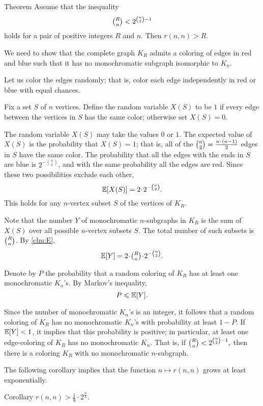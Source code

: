 \medskip

\begin{thm}{Theorem}\label{thm:ramsey-lower}
Assume that the inequality 
\[\tbinom R n < 2^{{\binom n 2} - 1}\]
holds for a pair of positive integers $R$ and $n$.
Then $r(n,n)>R$.
\end{thm}

We need to show that the complete graph $K_R$
admits a coloring of edges in red and blue such that it has no monochromatic subgraph isomorphic to $K_n$.

Let us color the edges randomly;
that is, color each edge independently in red or blue with equal chances.

Fix a set $S$ of $n$ vertices. 
Define the random variable $X(S)$ to be $1$ if every edge between the vertices in $S$ has the same color; otherwise set $X(S)=0$.

The random variable $X(S)$ may take the values $0$ or $1$.
The expected value of $X(S)$ is the probability that $X(S)=1$;
that is, all of the $\tbinom n 2=\tfrac{n\cdot(n-1)}{2}$
edges in $S$ have the same color. 
The probability that all the edges with the ends in $S$ are blue is ${2^{-\binom n 2}}$, and with the same probability all the edges are red.
Since these two possibilities exclude each other, 
\[\EE[X(S)]={2}\cdot {2^{-\binom n 2}}.\]
This holds for any $n$-vertex subset $S$ of the vertices of $K_R$.

Note that the number $Y$ of monochromatic $n$-subgraphs in $K_R$ is the sum of $X(S)$ over all possible $n$-vertex subsets $S$. 
The total number of such subsets is $\tbinom R n$.
By \ref{clm:E}, 
\[\EE[Y]=2\cdot \tbinom R n\cdot 2^{-\binom n 2}.\]

Denote by $P$ the probability that a random coloring of $K_R$ has at least one monochromatic $K_n$'s.
By Markov's inequality, 
\[P\leqslant \mathbb{E}[Y].\]

Since the number of monochromatic $K_n$'s is an integer, it follows that 
a random coloring of $K_R$ has no monochromatic $K_n$'s with probability at least $1-P$.
If $\mathbb{E}[Y]<1$, it implies that this probability is positive;
in particular, at least one edge-coloring of $K_R$ has no monochromatic $K_n$. 
That is, if
$\tbinom R n < 2^{\binom n 2 - 1},$
then there is a coloring $K_R$ with no monochromatic $n$-subgraph.
\qeds

The following corollary implies that the function $n\mapsto r(n,n)$ grows at least exponentially. 

\begin{thm}{Corollary}\label{cor:2^n/2}
$r(n, n)> \tfrac1{8}\cdot 2^{\frac{n}{2}}$.
\end{thm}


